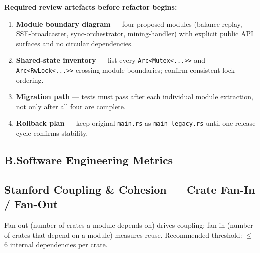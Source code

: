 \documentclass[12pt,a4paper]{article}
\begin{document}
\textbf{Required review artefacts before refactor begins:}
\begin{enumerate}[leftmargin=*,itemsep=2pt]
  \item \textbf{Module boundary diagram} --- four proposed modules
    (balance-replay, SSE-broadcaster, sync-orchestrator, mining-handler)
    with explicit public API surfaces and no circular dependencies.
  \item \textbf{Shared-state inventory} --- list every \texttt{Arc<Mutex<...>>}
    and \texttt{Arc<RwLock<...>>} crossing module boundaries; confirm
    consistent lock ordering.
  \item \textbf{Migration path} --- tests must pass after each individual
    module extraction, not only after all four are complete.
  \item \textbf{Rollback plan} --- keep original \texttt{main.rs} as
    \texttt{main\_legacy.rs} until one release cycle confirms stability.
\end{enumerate}

\subsection*{B.\enspace Software Engineering Metrics}

\subsection{Stanford Coupling \& Cohesion --- Crate Fan-In / Fan-Out}

Fan-out (number of crates a module depends on) drives coupling; fan-in
(number of crates that depend on a module) measures reuse.
Recommended threshold: $\leq$6 internal dependencies per crate.
\end{document}
